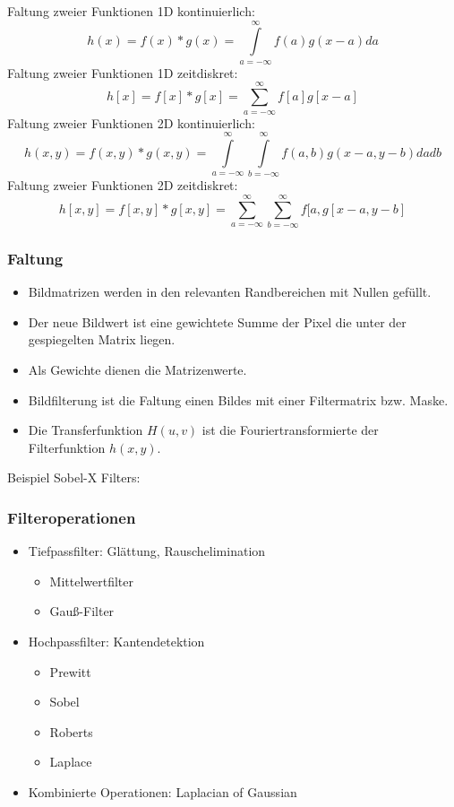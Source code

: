 Faltung zweier Funktionen 1D kontinuierlich: $$h(x) = f(x) * g(x) = \int\limits_{a = - \infty}^{\infty} f(a) g(x-a) da$$
Faltung zweier Funktionen 1D zeitdiskret: $$h[x] = f[x] * g[x] = \sum\limits_{a = - \infty}^{\infty} f[a] g[x-a]$$
Faltung zweier Funktionen 2D kontinuierlich: $$h(x,y) = f(x,y) * g(x,y) = \int\limits_{a = -\infty}^{\infty} \int\limits_{b = -\infty}^{\infty} f(a,b) g(x-a,y-b) dadb$$
Faltung zweier Funktionen 2D zeitdiskret: $$h[x,y] = f[x,y] * g[x,y] = \sum\limits_{a = -\infty}^{\infty} \sum\limits_{b = -\infty}^{\infty} f[a, g[x-a,y-b]$$

\subsubsection*{Faltung}

\begin{itemize}
\item Bildmatrizen werden in den relevanten Randbereichen mit Nullen gefüllt.
\item Der neue Bildwert ist eine gewichtete Summe der Pixel die unter der gespiegelten Matrix liegen.
\item Als Gewichte dienen die Matrizenwerte.
\item Bildfilterung ist die Faltung einen Bildes mit einer Filtermatrix bzw. Maske.
\item Die Transferfunktion $H(u,v)$ ist die Fouriertransformierte der Filterfunktion $h(x,y)$.
\end{itemize}


Beispiel Sobel-X Filters:

\subsubsection*{Filteroperationen}

\begin{itemize}
\item Tiefpassfilter: Glättung, Rauschelimination
\begin{itemize}
	\item Mittelwertfilter
	\item Gauß-Filter
\end{itemize}
\item Hochpassfilter: Kantendetektion
\begin{itemize}
	\item Prewitt
	\item Sobel
	\item Roberts
	\item Laplace
\end{itemize}
\item Kombinierte Operationen: Laplacian of Gaussian
\end{itemize}

